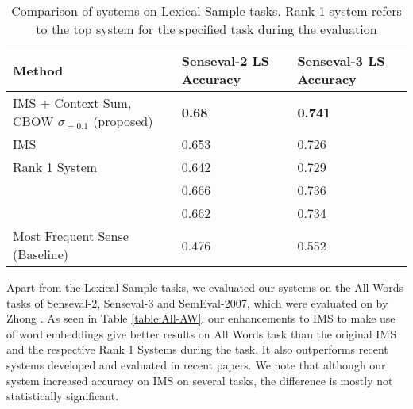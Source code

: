 \begin{table}
	\caption{Comparison of systems on Lexical Sample tasks. Rank 1 system refers to the top system for the specified task during the evaluation}
	\label{table:top-LS}
	\begin{center}
		\begin{tabular}{| p{7cm} | p{4cm} | p{4cm} |}
			\hline
			Method & Senseval-2 LS Accuracy & Senseval-3 LS Accuracy \\
			\hline
			IMS + Context Sum, CBOW $\sigma _{=0.1}$ (proposed) & {\bf0.68} & {\bf0.741} \\
			\hline
			
			IMS & 0.653 & 0.726\\
			\hline
			Rank 1 System & 0.642 & 0.729 \\
			\hline
			\newcite{rothe2015autoextend} & 0.666 & 0.736 \\
			\hline
			\newcite{Taghipour15} & 0.662 & 0.734 \\
			\hline
			Most Frequent Sense (Baseline) & 0.476 & 0.552 \\
			\hline
		\end{tabular}
	\end{center}
\end{table}



Apart from the Lexical Sample tasks, we evaluated our systems on the All Words tasks of Senseval-2, Senseval-3 and SemEval-2007, which were evaluated on by Zhong . As seen in Table \ref{table:All-AW}, our enhancements to IMS to make use of word embeddings give better results on All Words task than the original IMS and the respective Rank 1 Systems during the task. It also outperforms recent systems developed and evaluated in recent papers. We note that although our system increased accuracy on IMS on several tasks, the difference is mostly not statistically significant. 

